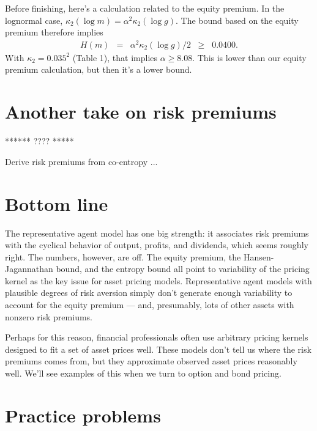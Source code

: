 \documentclass[11pt]{article}
\begin{document}
Before finishing, here's a calculation related to the equity premium.
In the lognormal case,
$\kappa_2(\log m) = \alpha^2 \kappa_2(\log g)$.
The bound based on the equity premium therefore implies
\begin{eqnarray*}
    H(m) &=& \alpha^2 \kappa_2(\log g)/2 \;\;\geq\;\; 0.0400 .
\end{eqnarray*}
With $\kappa_2 = 0.035^2 $ (Table 1),
that implies $\alpha \geq 8.08$.
This is lower than our equity premium calculation,
but then it's a lower bound.

\section{Another take on risk premiums} 

****** ???? *****

Derive risk premiums from co-entropy ...  


\section*{Bottom line}

The representative agent model has one big strength:
it associates risk premiums with the cyclical behavior
of output, profits, and dividends, which seems roughly right.
The numbers, however, are off.
The equity premium, the Hansen-Jagannathan bound, and the entropy bound
all point to variability of the pricing kernel as the key issue for asset pricing models.
Representative agent models with plausible degrees of risk aversion simply don't generate
enough variability to account for the equity premium --- and, presumably,
lots of other assets with nonzero risk premiums.

Perhaps for this reason, financial professionals often
use arbitrary pricing kernels designed to fit a set
of asset prices well.
These models don't tell us where the risk premiums comes from,
but they approximate observed asset prices reasonably well.
We'll see examples of this when we turn to option and bond pricing.


\section*{Practice problems}
\end{document}
